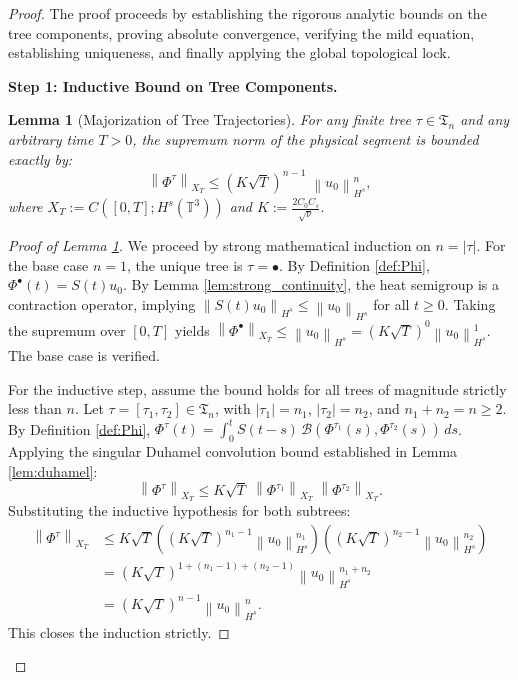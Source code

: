 \documentclass[12pt,a4paper]{article}
\theoremstyle{plain}
\newtheorem{lemma}[theorem]{Lemma}
\theoremstyle{definition}
\theoremstyle{remark}
\newcommand{\Hs}{H^s}
\newcommand{\T}{\mathbb{T}}
\newcommand{\norm}[1]{\left\|#1\right\|}
\newcommand{\BB}{\mathcal{B}}
\newcommand{\fT}{\mathfrak{T}}
\begin{document}
\begin{proof}
The proof proceeds by establishing the rigorous analytic bounds on the tree components, proving absolute convergence, verifying the mild equation, establishing uniqueness, and finally applying the global topological lock.

\noindent\textbf{Step 1: Inductive Bound on Tree Components.}
\begin{lemma}[Majorization of Tree Trajectories]
\label{lem:tree_bounds}
For any finite tree $\tau \in \fT_n$ and any arbitrary time $T > 0$, the supremum norm of the physical segment is bounded exactly by:
\[
  \norm{\Phi^\tau}_{X_T} \le (K\sqrt{T})^{n-1}\;\norm{u_0}_{H^s}^n,
\]
where $X_T := C([0,T];\Hs(\T^3))$ and $K := \frac{2C_0 C_s}{\sqrt{\nu}}$.
\end{lemma}

\begin{proof}[Proof of Lemma \ref{lem:tree_bounds}]
We proceed by strong mathematical induction on $n = |\tau|$.
For the base case $n=1$, the unique tree is $\tau = \bullet$. By Definition \ref{def:Phi}, $\Phi^\bullet(t) = S(t)u_0$. By Lemma \ref{lem:strong_continuity}, the heat semigroup is a contraction operator, implying $\norm{S(t)u_0}_{H^s} \le \norm{u_0}_{H^s}$ for all $t \ge 0$. Taking the supremum over $[0,T]$ yields $\norm{\Phi^\bullet}_{X_T} \le \norm{u_0}_{H^s} = (K\sqrt{T})^0 \norm{u_0}_{H^s}^1$. The base case is verified.

For the inductive step, assume the bound holds for all trees of magnitude strictly less than $n$. Let $\tau = [\tau_1, \tau_2] \in \fT_n$, with $|\tau_1| = n_1$, $|\tau_2| = n_2$, and $n_1 + n_2 = n \ge 2$. 
By Definition \ref{def:Phi}, $\Phi^\tau(t) = \int_0^t S(t-s)\,\BB(\Phi^{\tau_1}(s),\Phi^{\tau_2}(s))\,ds$.
Applying the singular Duhamel convolution bound established in Lemma \ref{lem:duhamel}:
\[
  \norm{\Phi^\tau}_{X_T} \le K\sqrt{T}\;\norm{\Phi^{\tau_1}}_{X_T}\;\norm{\Phi^{\tau_2}}_{X_T}.
\]
Substituting the inductive hypothesis for both subtrees:
\begin{align*}
  \norm{\Phi^\tau}_{X_T} 
  &\le K\sqrt{T} \left( (K\sqrt{T})^{n_1-1}\norm{u_0}_{H^s}^{n_1} \right) \left( (K\sqrt{T})^{n_2-1}\norm{u_0}_{H^s}^{n_2} \right) \\
  &= (K\sqrt{T})^{1 + (n_1-1) + (n_2-1)} \norm{u_0}_{H^s}^{n_1+n_2} \\
  &= (K\sqrt{T})^{n-1} \norm{u_0}_{H^s}^n.
\end{align*}
This closes the induction strictly.
\end{proof}


\end{proof}
\end{document}
